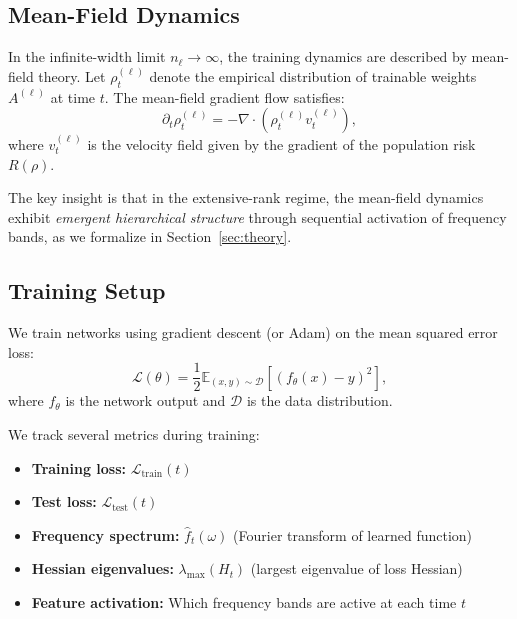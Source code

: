 \subsection{Mean-Field Dynamics}

In the infinite-width limit $n_\ell \to \infty$, the training dynamics are described by mean-field theory. Let $\rho_t^{(\ell)}$ denote the empirical distribution of trainable weights $A^{(\ell)}$ at time $t$. The mean-field gradient flow satisfies:
\begin{equation}
\label{eq:meanfield-flow}
\partial_t \rho_t^{(\ell)} = -\nabla \cdot (\rho_t^{(\ell)} v_t^{(\ell)}),
\end{equation}
where $v_t^{(\ell)}$ is the velocity field given by the gradient of the population risk $R(\rho)$.

The key insight is that in the extensive-rank regime, the mean-field dynamics exhibit \emph{emergent hierarchical structure} through sequential activation of frequency bands, as we formalize in Section~\ref{sec:theory}.

\subsection{Training Setup}

We train networks using gradient descent (or Adam) on the mean squared error loss:
\begin{equation}
\label{eq:loss}
\mathcal{L}(\theta) = \frac{1}{2}\mathbb{E}_{(x,y) \sim \mathcal{D}} \left[ (f_\theta(x) - y)^2 \right],
\end{equation}
where $f_\theta$ is the network output and $\mathcal{D}$ is the data distribution.

We track several metrics during training:
\begin{itemize}
    \item \textbf{Training loss:} $\mathcal{L}_{\text{train}}(t)$
    \item \textbf{Test loss:} $\mathcal{L}_{\text{test}}(t)$
    \item \textbf{Frequency spectrum:} $\hat{f}_t(\omega)$ (Fourier transform of learned function)
    \item \textbf{Hessian eigenvalues:} $\lambda_{\max}(H_t)$ (largest eigenvalue of loss Hessian)
    \item \textbf{Feature activation:} Which frequency bands are active at each time $t$
\end{itemize}
